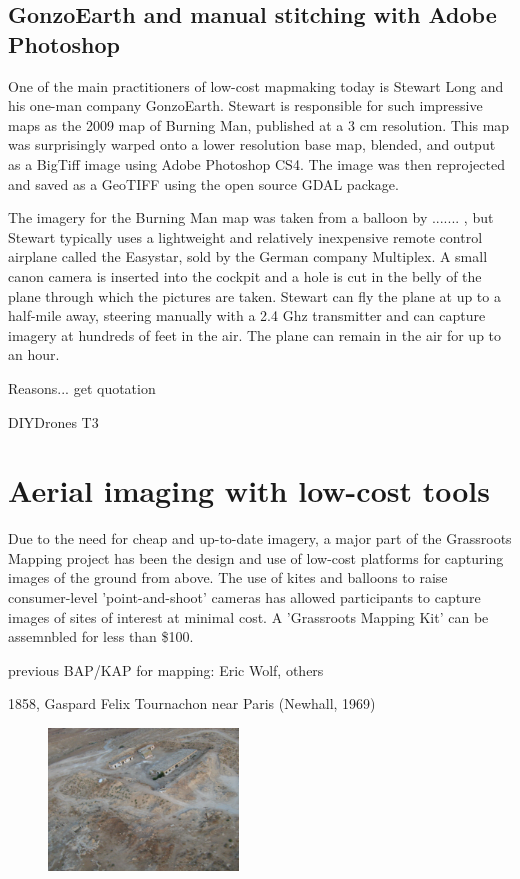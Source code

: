 \documentclass[11pt]{report}
\begin{document}
\subsection{GonzoEarth and manual stitching with Adobe Photoshop}
\label{subsec:gonzoearth}
One of the main practitioners of low-cost mapmaking today is Stewart Long and his one-man company GonzoEarth. Stewart is responsible for such impressive maps as the 2009 map of Burning Man, published at a 3 cm resolution. This map was surprisingly warped onto a lower resolution base map, blended, and output as a BigTiff image using Adobe Photoshop CS4. The image was then reprojected and saved as a \ac{GeoTIFF} using the open source GDAL package.

The imagery for the Burning Man map was taken from a balloon by ....... , but Stewart typically uses a lightweight and relatively inexpensive remote control airplane called the Easystar, sold by the German company Multiplex. A small canon camera is inserted into the cockpit and a hole is cut in the belly of the plane through which the pictures are taken. Stewart can fly the plane at up to a half-mile away, steering manually with a 2.4 Ghz transmitter and can capture imagery at hundreds of feet in the air. The plane can remain in the air for up to an hour. 

Reasons... get quotation

DIYDrones T3


\section{Aerial imaging with low-cost tools}
\label{sec:aeriallowcost}

Due to the need for cheap and up-to-date imagery, a major part of the Grassroots Mapping project has been the design and use of low-cost platforms for capturing images of the ground from above. The use of kites and balloons to raise consumer-level 'point-and-shoot' cameras has allowed participants to capture images of sites of interest at minimal cost. A 'Grassroots Mapping Kit' can be assemnbled for less than \$100. 

previous BAP/KAP for mapping: Eric Wolf, others

1858, Gaspard Felix Tournachon near Paris (Newhall, 1969) \cite{vierling2006short}

\begin{figure}
	\begin{flushright}
		\includegraphics[width=0.45\textwidth]{images/maron-spy-satellite.jpg}
		\cite{maron2008former}
	\end{flushright}
\end{figure}
\end{document}
